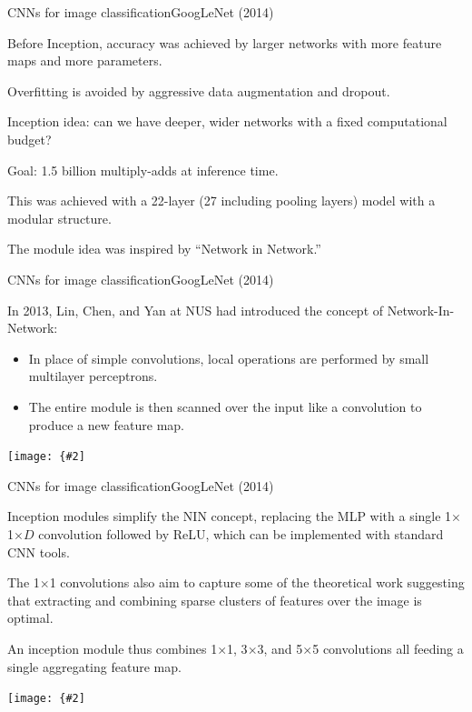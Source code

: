 \documentclass[aspectratio=169]{beamer}
\newcommand{\myfig}[3]{\centerline{\texttt{[image: \{\#2]}}}
\begin{document}
\begin{frame}{CNNs for image classification}{GoogLeNet (2014)}

  Before Inception, accuracy was achieved by larger networks with more
  feature maps and more parameters.

  \medskip

  Overfitting is avoided by aggressive data augmentation and dropout.

  \medskip

  Inception idea: can we have deeper, wider networks with a fixed computational
  budget?

  \medskip

  Goal: 1.5 billion multiply-adds at inference time.

  \medskip

  This was achieved with a 22-layer (27 including pooling layers)
  model with a modular structure.

  \medskip

  The module idea was inspired by ``Network in Network.''

\end{frame}


\begin{frame}{CNNs for image classification}{GoogLeNet (2014)}

  In 2013, Lin, Chen, and Yan at NUS had introduced the concept of
  Network-In-Network:
  \begin{itemize}
  \item In place of simple convolutions, local operations are
    performed by small multilayer perceptrons.
  \item The entire module is then scanned over the input like a
    convolution to produce a new feature map.
  \end{itemize}
    
  \medskip
  
  \myfig{3in}{lin-fig1}{Lin, Chen, and Yan (2013), Fig.\ 1}
  
\end{frame}


\begin{frame}{CNNs for image classification}{GoogLeNet (2014)}

  Inception modules simplify the NIN concept, replacing the MLP with a
  single 1$\times$1$\times D$ convolution followed by ReLU, which can
  be implemented with standard CNN tools.
  
  \medskip

  The 1$\times$1 convolutions also aim to capture some of the
  theoretical work suggesting that extracting and combining sparse
  clusters of features over the image is optimal.
  
  \medskip

  An inception module thus combines 1$\times$1, 3$\times$3, and
  5$\times$5 convolutions all feeding a single aggregating feature
  map.

  \medskip

  \myfig{3in}{szegedy-fig2}{Szegedy et al.\ (2014), Fig.\ 2}
  
\end{frame}
\end{document}
